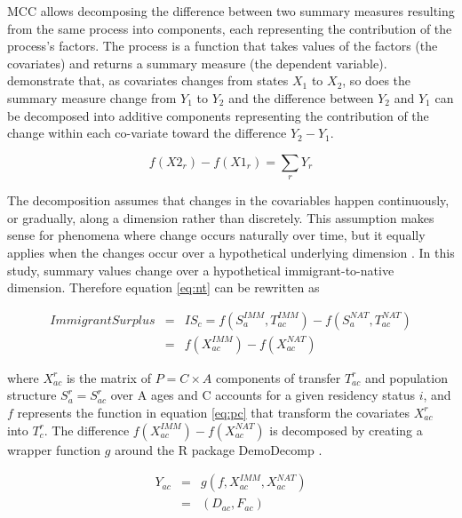MCC allows decomposing the difference between two summary measures resulting from the same process into components, each representing the contribution of the process's factors.
The process is a function that takes values of the factors (the covariates) and returns a summary measure (the dependent variable).
\citet{Horiuchi:2008cn} demonstrate that, as covariates changes from states \( X_1 \) to \( X_2 \),  so does the summary measure change from \( Y_1 \) to \( Y_2 \)  and the difference between \( Y_2 \) and \( Y_1 \) can be decomposed into additive components representing the contribution of the change within each co-variate toward the difference \( Y_2 - Y_1\).

\begin{equation}\label{eq:ho}
  f(X2_{r}) - f(X1_{r}) = \displaystyle\sum_{r}Y_{r}
\end{equation}

The decomposition assumes that changes in the covariables happen continuously, or gradually, along a dimension rather than discretely.
This assumption makes sense for phenomena where change occurs naturally over time, but it equally applies when the changes occur over a hypothetical underlying dimension \citep[p.~790]{Horiuchi:2008cn}.
In this study, summary values change over a hypothetical immigrant-to-native dimension.
Therefore equation \eqref{eq:nt} can be rewritten as

\begin{eqnarray}
  Immigrant Surplus &=&IS_{c}=f(S^{IMM}_a, T^{IMM}_{ac})-f(S^{NAT}_a, T^{NAT}_{ac}) \nonumber \\
&=& f(X^{IMM}_{ac})-f(X^{NAT}_{ac}) \label{eq:dc}
\end{eqnarray}

\vspace{0.7em}\par
where \( X^{r}_{ac}\) is the matrix of \( P=C \times A  \) components of transfer \( T^{r}_{ac} \) and population structure \( S^{r}_{a}=S^{r}_{ac} \) over A ages and C accounts for a given residency status \( i \), and \( f \) represents the function in equation \eqref{eq:pc} that transform the covariates \( X^{r}_{ac}\) into \(T^{r}_c\).
The difference \( f(X^{IMM}_{ac}) - f(X^{NAT}_{ac}) \) is decomposed by creating a wrapper function \(g\) around the R \citep{Rstat:2018} package DemoDecomp \citep{DemoDecomp:2018}.

\begin{eqnarray}
  Y_{ac}&=&g(f,X^{IMM}_{ac},X^{NAT}_{ac}) \nonumber \\
&=& (D_{ac}, F_{ac}) \label{eq:dc2}
\end{eqnarray}

